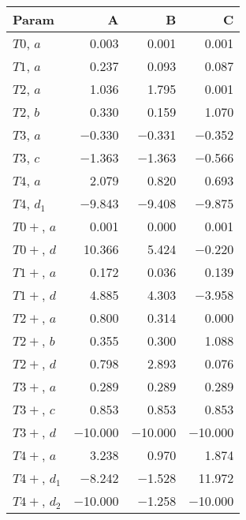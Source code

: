 \begin{tabular}{lrrr}
\toprule
 Param        &       A &       B &       C \\
\midrule
 $T0$, $a$    &   \num{0.003} &   \num{0.001} &   \num{0.001} \\
 $T1$, $a$    &   \num{0.237} &   \num{0.093} &   \num{0.087} \\
 $T2$, $a$    &   \num{1.036} &   \num{1.795} &   \num{0.001} \\
 $T2$, $b$    &   \num{0.330} &   \num{0.159} &   \num{1.070} \\
 $T3$, $a$    &  \num{-0.330} &  \num{-0.331} &  \num{-0.352} \\
 $T3$, $c$    &  \num{-1.363} &  \num{-1.363} &  \num{-0.566} \\
 $T4$, $a$    &   \num{2.079} &   \num{0.820} &   \num{0.693} \\
 $T4$, $d_1$  &  \num{-9.843} &  \num{-9.408} &  \num{-9.875} \\
 $T0+$, $a$   &   \num{0.001} &   \num{0.000} &   \num{0.001} \\
 $T0+$, $d$   &  \num{10.366} &   \num{5.424} &  \num{-0.220} \\
 $T1+$, $a$   &   \num{0.172} &   \num{0.036} &   \num{0.139} \\
 $T1+$, $d$   &   \num{4.885} &   \num{4.303} &  \num{-3.958} \\
 $T2+$, $a$   &   \num{0.800} &   \num{0.314} &   \num{0.000} \\
 $T2+$, $b$   &   \num{0.355} &   \num{0.300} &   \num{1.088} \\
 $T2+$, $d$   &   \num{0.798} &   \num{2.893} &   \num{0.076} \\
 $T3+$, $a$   &   \num{0.289} &   \num{0.289} &   \num{0.289} \\
 $T3+$, $c$   &   \num{0.853} &   \num{0.853} &   \num{0.853} \\
 $T3+$, $d$   & \num{-10.000} & \num{-10.000} & \num{-10.000} \\
 $T4+$, $a$   &   \num{3.238} &   \num{0.970} &   \num{1.874} \\
 $T4+$, $d_1$ &  \num{-8.242} &  \num{-1.528} &  \num{11.972} \\
 $T4+$, $d_2$ & \num{-10.000} &  \num{-1.258} & \num{-10.000} \\
\bottomrule
\end{tabular}